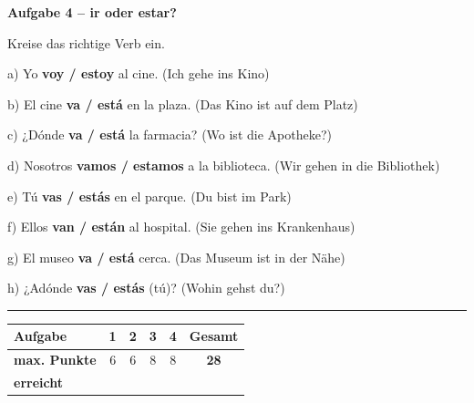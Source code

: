 \documentclass[11pt, a4paper]{article}
\newcommand{\fachfarbe}{spanisch}
\newcommand{\punktebox}[1]{\hfill\fbox{\small \_\_\_/#1}}
\newenvironment{aufgabe}[1]{%
    \needspace{5\baselineskip}%
    \nopagebreak[4]%
    \vspace{10pt}
    \noindent\textbf{\textcolor{\fachfarbe}{Aufgabe #1}}
    \nopagebreak[4]%
    \vspace{5pt}
    \nopagebreak[4]%
    \begin{list}{}{\leftmargin=0pt}
    \item[]
}{%
    \end{list}
}
\begin{document}
\begin{aufgabe}{4 -- ir oder estar?}
Kreise das richtige Verb ein. \punktebox{8}
\end{aufgabe}

\noindent
a) Yo \textbf{voy / estoy} al cine. (Ich gehe ins Kino)

\vspace{0.8em}

\noindent
b) El cine \textbf{va / está} en la plaza. (Das Kino ist auf dem Platz)

\vspace{0.8em}

\noindent
c) ¿Dónde \textbf{va / está} la farmacia? (Wo ist die Apotheke?)

\vspace{0.8em}

\noindent
d) Nosotros \textbf{vamos / estamos} a la biblioteca. (Wir gehen in die Bibliothek)

\vspace{0.8em}

\noindent
e) Tú \textbf{vas / estás} en el parque. (Du bist im Park)

\vspace{0.8em}

\noindent
f) Ellos \textbf{van / están} al hospital. (Sie gehen ins Krankenhaus)

\vspace{0.8em}

\noindent
g) El museo \textbf{va / está} cerca. (Das Museum ist in der Nähe)

\vspace{0.8em}

\noindent
h) ¿Adónde \textbf{vas / estás} (tú)? (Wohin gehst du?)


\vspace{25pt}
\hrule
\vspace{10pt}

\noindent
\begin{tabularx}{\textwidth}{|X|c|c|c|c||c|}
\hline
\textbf{Aufgabe} & 1 & 2 & 3 & 4 & \textbf{Gesamt} \\
\hline
\textbf{max. Punkte} & 6 & 6 & 8 & 8 & \textbf{28} \\
\hline
\textbf{erreicht} & & & & & \\[0.8em]
\hline
\end{tabularx}
\end{document}

